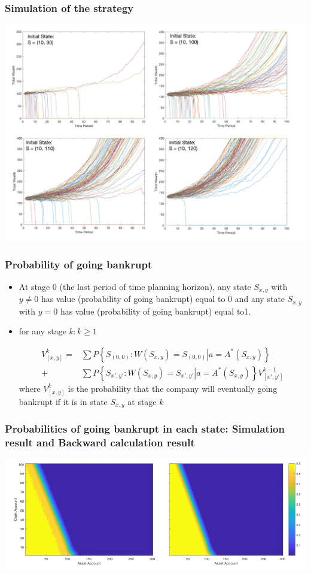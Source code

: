 \documentclass{beamer}
\begin{document}
\begin{frame}
\frametitle{Simulation of the strategy}
\includegraphics[scale = 0.4]{simu.png}
\end{frame}

\begin{frame}
\frametitle{Probability of going bankrupt}
\begin{itemize}
\item At stage 0 (the last period of time planning horizon), any state $S_{x, y}$ with $y \neq 0$ has value (probability of going bankrupt) equal to 0 and any state $S_{x, y}$ with $y = 0$ has value (probability of going bankrupt) equal to1.
\item for any stage $k: k \geq 1$

\[
\begin{split}
V_{[x,y]}^{k} =& \sum P\left\{\left.S_{(0,0)}:W(S_{x,y}) = S_{(0,0)}\right|a = A^*(S_{x,y})\right\} 
\\ 
+ & \sum P\left\{ \left. S_{x',y'}:W(S_{x,y}) = S_{x',y'} \right| a = A^* (S_{x,y})\right\}  V_{[x',y']}^{k-1}
\end{split}
\]
where $V_{[x,y]}^{k} $ is the probability that the company will eventually going bankrupt if it is in state $S_{x,y}$ at stage $k$
\end{itemize}
\end{frame}

\begin{frame}
\frametitle{Probabilities of going bankrupt in each state: Simulation result and Backward calculation result}
\includegraphics[scale = 0.35]{prob.png}
\end{frame}
\end{document}
